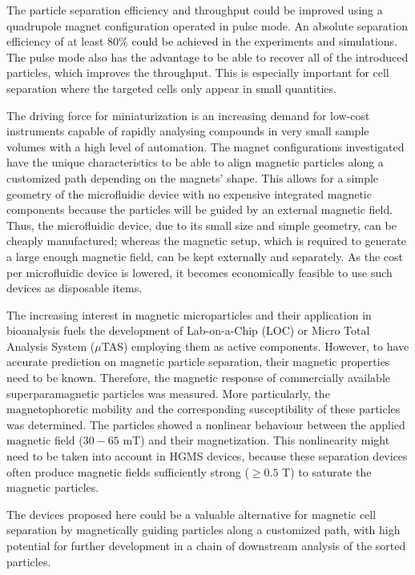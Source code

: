 The particle separation efficiency and throughput could be improved using a quadrupole magnet configuration operated in pulse mode. An absolute separation efficiency of at least $80\%$ could be achieved in the experiments and simulations. The pulse mode also has the advantage to be able to recover all of the introduced particles, which improves the throughput. This is especially important for cell separation where the targeted cells only appear in small quantities. 

The driving force for miniaturization is an increasing demand for low-cost instruments capable of rapidly analysing compounds in very small sample volumes with a high level of automation. The magnet configurations investigated have the unique characteristics to be able to align magnetic particles along a customized path depending on the magnets' shape. This allows for a simple geometry of the microfluidic device with no expensive integrated magnetic components because the particles will be guided by an external magnetic field. Thus, the microfluidic device, due to its small size and simple geometry, can be cheaply manufactured; whereas the magnetic setup, which is required to generate a large enough magnetic field, can be kept externally and separately. As the cost per microfluidic device is lowered, it becomes economically feasible to use such devices as disposable items.

The increasing interest in magnetic microparticles and their application in bioanalysis fuels the development of Lab-on-a-Chip (LOC) or Micro Total Analysis System ($\mu$TAS) employing them as active components. However, to have accurate prediction on magnetic particle separation, their magnetic properties need to be known. Therefore, the magnetic response of commercially available superparamagnetic particles was measured. More particularly, the magnetophoretic mobility and the corresponding susceptibility of these particles was determined. The particles showed a nonlinear behaviour between the applied magnetic field ($30-65$ mT) and their magnetization. This nonlinearity might need to be taken into account in HGMS devices, because these separation devices often produce magnetic fields sufficiently strong ($\geq 0.5$ T) to saturate the magnetic particles. 

The devices proposed here could be a valuable alternative for magnetic cell separation by magnetically guiding particles along a customized path, with high potential for further development in a chain of downstream analysis of the sorted particles.  

